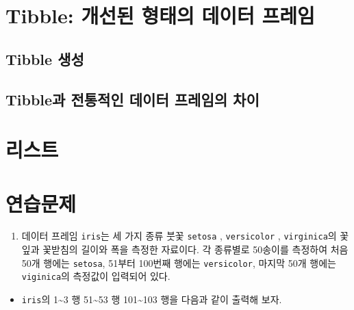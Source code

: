 \documentclass[
]{book}
\providecommand{\tightlist}{%
  \setlength{\itemsep}{0pt}\setlength{\parskip}{0pt}}
\begin{document}
\hypertarget{tibble-uxac1cuxc120uxb41c-uxd615uxd0dcuxc758-uxb370uxc774uxd130-uxd504uxb808uxc784}{%
\section{Tibble: 개선된 형태의 데이터 프레임}\label{tibble-uxac1cuxc120uxb41c-uxd615uxd0dcuxc758-uxb370uxc774uxd130-uxd504uxb808uxc784}}

\hypertarget{tibble-uxc0dduxc131}{%
\subsection{Tibble 생성}\label{tibble-uxc0dduxc131}}

\hypertarget{tibbleuxacfc-uxc804uxd1b5uxc801uxc778-uxb370uxc774uxd130-uxd504uxb808uxc784uxc758-uxcc28uxc774}{%
\subsection{Tibble과 전통적인 데이터 프레임의 차이}\label{tibbleuxacfc-uxc804uxd1b5uxc801uxc778-uxb370uxc774uxd130-uxd504uxb808uxc784uxc758-uxcc28uxc774}}

\hypertarget{section-list}{%
\section{리스트}\label{section-list}}

\hypertarget{uxc5f0uxc2b5uxbb38uxc81c}{%
\section{연습문제}\label{uxc5f0uxc2b5uxbb38uxc81c}}

\begin{enumerate}
\def\labelenumi{\arabic{enumi}.}
\tightlist
\item
  데이터 프레임 \texttt{iris}는 세 가지 종류 붓꽃 \texttt{setosa} , \texttt{versicolor} , \texttt{virginica}의 꽃잎과 꽃받침의 길이와 폭을 측정한 자료이다. 각 종류별로 50송이를 측정하여 처음 50개 행에는 \texttt{setosa}, 51부터 100번째 행에는 \texttt{versicolor}, 마지막 50개 행에는 \texttt{viginica}의 측정값이 입력되어 있다.
\end{enumerate}

\begin{itemize}
\tightlist
\item
  \texttt{iris}의 1\textasciitilde3 행 51\textasciitilde53 행 101\textasciitilde103 행을 다음과 같이 출력해 보자.
\end{itemize}
\end{document}
